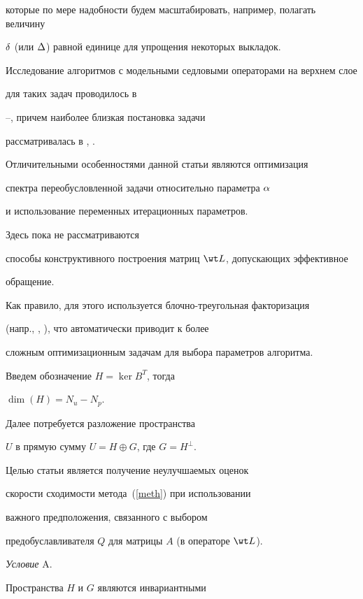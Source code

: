 которые по мере надобности будем масштабировать, например, полагать величину


$\delta$ (или $\Delta$) равной единице для упрощения некоторых выкладок.





Исследование алгоритмов с модельными седловыми операторами на верхнем слое


для таких задач проводилось в


\cite{Diak2}--\cite{Zul}, причем наиболее близкая постановка задачи


рассматривалась в \cite{Diak2}, \cite{BSar}.


Отличительными особенностями данной статьи являются оптимизация 


спектра переобусловленной задачи относительно параметра $\alpha$


и использование переменных итерационных параметров. 


Здесь пока не рассматриваются


способы конструктивного построения матриц $\wt L$, допускающих эффективное


обращение. 


Как правило, для этого используется блочно-треугольная факторизация


(напр., \cite{BWY}, \cite{VasLaz}), что автоматически приводит к более 


сложным оптимизационным задачам для выбора параметров алгоритма.





Введем обозначение $H = \ker B^T$, тогда


$\dim(H) = N_u - N_p$.


Далее потребуется разложение пространства


$U$ в прямую сумму $U = H \oplus G$, где $G = H^{\perp}$.


Целью статьи является получение неулучшаемых оценок


скорости сходимости метода~(\ref{meth}) при использовании


важного предположения, связанного с выбором


предобуславливателя $Q$ для матрицы $A$ (в операторе $\wt L$).


\medskip





{\it Условие} A.


Пространства $H$ и $G$ являются инвариантными


